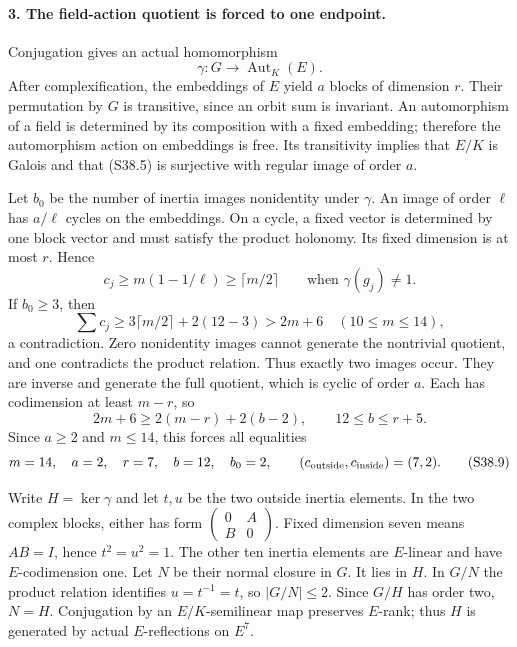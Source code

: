 \paragraph{3. The field-action quotient is forced to one endpoint.}
Conjugation gives an actual homomorphism
\[
               \gamma:G\longrightarrow\operatorname{Aut}_K(E).
                                                               \tag{S38.5}
\]
After complexification, the embeddings of \(E\) yield \(a\)
blocks of dimension \(r\). Their permutation by \(G\) is
transitive, since an orbit sum is invariant. An automorphism of a
field is determined by its composition with a fixed embedding;
therefore the automorphism action on embeddings is free. Its
transitivity implies that \(E/K\) is Galois and that (S38.5)
is surjective with regular image of order \(a\).

Let \(b_0\) be the number of inertia images nonidentity under
\(\gamma\). An image of order \(\ell\) has \(a/\ell\)
cycles on the embeddings. On a cycle, a fixed vector is determined
by one block vector and must satisfy the product holonomy.
Its fixed dimension is at most \(r\). Hence
\[
       c_j\ge m(1-1/\ell)\ge\lceil m/2\rceil
                   \qquad\text{when }\gamma(g_j)\ne1.       \tag{S38.6}
\]
If \(b_0\ge3\), then
\[
     \sum c_j\ge3\lceil m/2\rceil+2(12-3)>2m+6
                           \quad(10\le m\le14),             \tag{S38.7}
\]
a contradiction. Zero nonidentity images cannot generate the
nontrivial quotient, and one contradicts the product relation.
Thus exactly two images occur. They are inverse and generate
the full quotient, which is cyclic of order \(a\). Each has
codimension at least \(m-r\), so
\[
      2m+6\ge2(m-r)+2(b-2),\qquad12\le b\le r+5.           \tag{S38.8}
\]
Since \(a\ge2\) and \(m\le14\), this forces all equalities
\[
  m=14,\quad a=2,\quad r=7,\quad b=12,\quad b_0=2,
  \qquad(c_{\rm outside},c_{\rm inside})=(7,2).              \tag{S38.9}
\]

Write \(H=\ker\gamma\) and let \(t,u\) be the two outside
inertia elements. In the two complex blocks, either has form
\(\left(\begin{smallmatrix}0&A\\B&0\end{smallmatrix}\right)\).
Fixed dimension seven means \(AB=I\), hence \(t^2=u^2=1\).
The other ten inertia elements are \(E\)-linear and have
\(E\)-codimension one. Let \(N\) be their normal closure
in \(G\). It lies in \(H\). In \(G/N\) the product
relation identifies \(u=t^{-1}=t\), so \(|G/N|\le2\).
Since \(G/H\) has order two, \(N=H\).
Conjugation by an \(E/K\)-semilinear map preserves
\(E\)-rank; thus \(H\) is generated by actual
\(E\)-reflections on \(E^7\).


